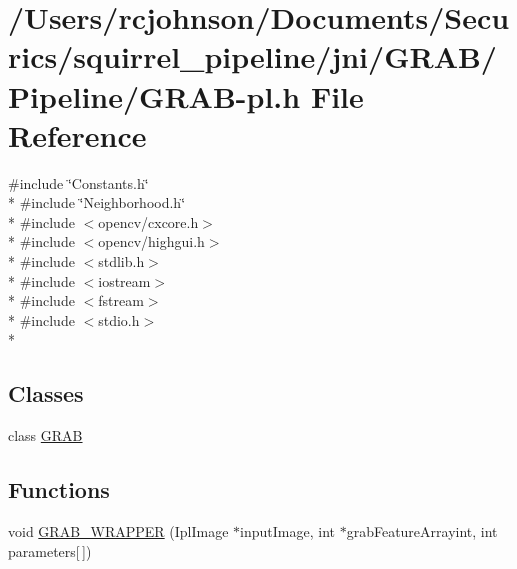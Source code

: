 \hypertarget{_g_r_a_b-pl_8h}{\section{/\-Users/rcjohnson/\-Documents/\-Securics/squirrel\-\_\-pipeline/jni/\-G\-R\-A\-B/\-Pipeline/\-G\-R\-A\-B-\/pl.h File Reference}
\label{_g_r_a_b-pl_8h}
}
{\ttfamily \#include \char`\"{}Constants.\-h\char`\"{}}\\*
{\ttfamily \#include \char`\"{}Neighborhood.\-h\char`\"{}}\\*
{\ttfamily \#include $<$opencv/cxcore.\-h$>$}\\*
{\ttfamily \#include $<$opencv/highgui.\-h$>$}\\*
{\ttfamily \#include $<$stdlib.\-h$>$}\\*
{\ttfamily \#include $<$iostream$>$}\\*
{\ttfamily \#include $<$fstream$>$}\\*
{\ttfamily \#include $<$stdio.\-h$>$}\\*
\subsection*{Classes}
\begin{DoxyCompactItemize}
\item 
class \hyperlink{class_g_r_a_b}{G\-R\-A\-B}
\end{DoxyCompactItemize}
\subsection*{Functions}
\begin{DoxyCompactItemize}
\item 
void \hyperlink{_g_r_a_b-pl_8h_a3bf55435ffd17412508e5040fc61ae93}{G\-R\-A\-B\-\_\-\-W\-R\-A\-P\-P\-E\-R} (Ipl\-Image $\ast$input\-Image, int $\ast$grab\-Feature\-Arrayint, int parameters\mbox{[}$\,$\mbox{]})
\end{DoxyCompactItemize}


